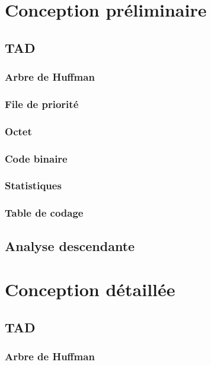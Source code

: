 \documentclass[12pt,a4paper]{article}
\begin{document}
\newpage

\section{Conception préliminaire}
\subsection{TAD}
\subsubsection{Arbre de Huffman}

\subsubsection{File de priorité}

\subsubsection{Octet}

\subsubsection{Code binaire}

\subsubsection{Statistiques}

\subsubsection{Table de codage}

\subsection{Analyse descendante}


\newpage

\section{Conception détaillée}
\subsection{TAD}
\subsubsection{Arbre de Huffman}
%
\end{document}
